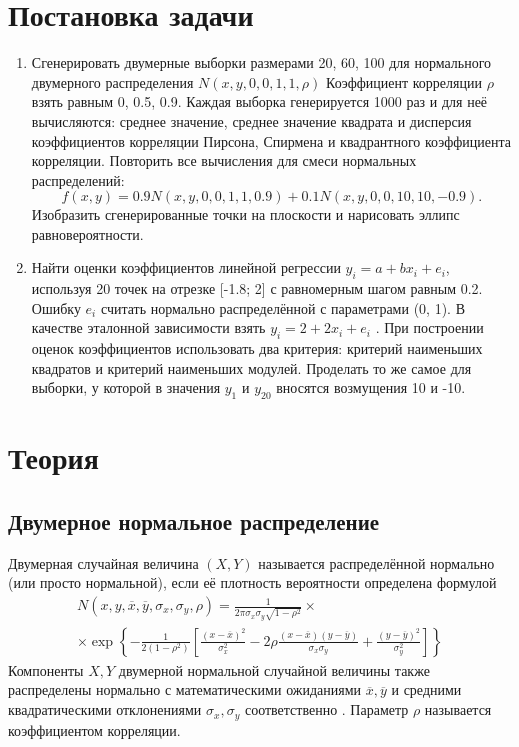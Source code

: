 \documentclass[12pt]{article}
\begin{document}
\section{Постановка задачи}
\begin{enumerate}
    \item Сгенерировать двумерные выборки размерами 20, 60, 100 для нормального двумерного распределения $N(x,y,0,0,1,1,\rho)$ Коэффициент корреляции $\rho$ взять равным 0, 0.5, 0.9. Каждая выборка генерируется 1000 раз и для неё вычисляются: среднее значение, среднее значение квадрата и дисперсия коэффициентов корреляции Пирсона, Спирмена и квадрантного коэффициента корреляции. Повторить все вычисления для смеси нормальных распределений:
    \begin{equation}
        f(x,y) = 0.9N(x,y,0,0,1,1,0.9) + 0.1N(x,y,0,0,10,10,−0.9).
        \label{mix}
    \end{equation}
    Изобразить сгенерированные точки на плоскости и нарисовать эллипс
    равновероятности.
    \item Найти оценки коэффициентов линейной регрессии $y_i = a + bx_i + e_i$, используя 20 точек на отрезке [-1.8; 2] с равномерным шагом равным 0.2. Ошибку $e_i$ считать нормально распределённой с параметрами (0, 1). В качестве эталонной зависимости взять $y_i = 2 + 2x_i + e_i$ . При построении оценок коэффициентов использовать два критерия: критерий наименьших квадратов и критерий наименьших модулей. Проделать то же самое для выборки, у которой в значения $y_1$ и $y_{20}$ вносятся возмущения 10 и -10.
\end{enumerate}

\newpage

\section{Теория}

\subsection{Двумерное нормальное распределение}
Двумерная случайная величина $(X, Y)$ называется распределённой нормально (или просто нормальной), если её плотность вероятности определена формулой
\begin{multline}
    N(x, y, \overline{x}, \overline{y}, \sigma_x, \sigma_y, \rho) = \frac{1}{2\pi\sigma_x\sigma_y\sqrt{1 - \rho^2}} \times\\
    \times \exp\left\{ -\frac{1}{2(1 - \rho^2)} \left[ \frac{(x - \overline{x})^2}{\sigma_x^2} - 2\rho\frac{(x - \overline{x})(y - \overline{y})}{\sigma_x\sigma_y} + \frac{(y - \overline{y})^2}{\sigma_y^2}\right] \right\}
    \label{normal2}
\end{multline}
Компоненты $X, Y$ двумерной нормальной случайной величины также распределены нормально с математическими ожиданиями $\overline{x}, \overline{y}$ и средними квадратическими отклонениями $\sigma_x, \sigma_y$ соответственно \cite{theory}. Параметр $\rho$ называется коэффициентом корреляции.
\end{document}
